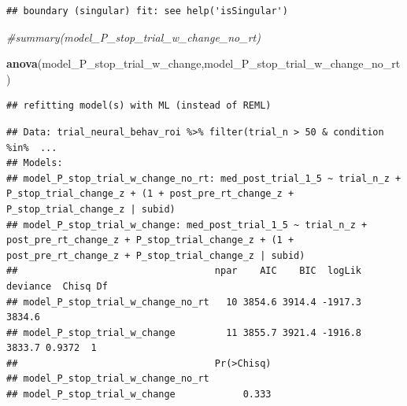 \documentclass[
]{article}
\newenvironment{Shaded}{\begin{snugshade}}{\end{snugshade}}
\newcommand{\CommentTok}[1]{\textcolor[rgb]{0.56,0.35,0.01}{\textit{#1}}}
\newcommand{\DecValTok}[1]{\textcolor[rgb]{0.00,0.00,0.81}{#1}}
\newcommand{\KeywordTok}[1]{\textcolor[rgb]{0.13,0.29,0.53}{\textbf{#1}}}
\newcommand{\NormalTok}[1]{#1}
\newcommand{\OperatorTok}[1]{\textcolor[rgb]{0.81,0.36,0.00}{\textbf{#1}}}
\newcommand{\StringTok}[1]{\textcolor[rgb]{0.31,0.60,0.02}{#1}}
\begin{document}
\begin{verbatim}
## boundary (singular) fit: see help('isSingular')
\end{verbatim}

\begin{Shaded}
\begin{Highlighting}[]
\CommentTok{#summary(model_P_stop_trial_w_change_no_rt)}

\KeywordTok{anova}\NormalTok{(model_P_stop_trial_w_change,model_P_stop_trial_w_change_no_rt)}
\end{Highlighting}
\end{Shaded}

\begin{verbatim}
## refitting model(s) with ML (instead of REML)
\end{verbatim}

\begin{verbatim}
## Data: trial_neural_behav_roi %>% filter(trial_n > 50 & condition %in%  ...
## Models:
## model_P_stop_trial_w_change_no_rt: med_post_trial_1_5 ~ trial_n_z + P_stop_trial_change_z + (1 + post_pre_rt_change_z + P_stop_trial_change_z | subid)
## model_P_stop_trial_w_change: med_post_trial_1_5 ~ trial_n_z + post_pre_rt_change_z + P_stop_trial_change_z + (1 + post_pre_rt_change_z + P_stop_trial_change_z | subid)
##                                   npar    AIC    BIC  logLik deviance  Chisq Df
## model_P_stop_trial_w_change_no_rt   10 3854.6 3914.4 -1917.3   3834.6          
## model_P_stop_trial_w_change         11 3855.7 3921.4 -1916.8   3833.7 0.9372  1
##                                   Pr(>Chisq)
## model_P_stop_trial_w_change_no_rt           
## model_P_stop_trial_w_change            0.333
\end{verbatim}

\begin{Shaded}
\end{Shaded}
\end{document}
